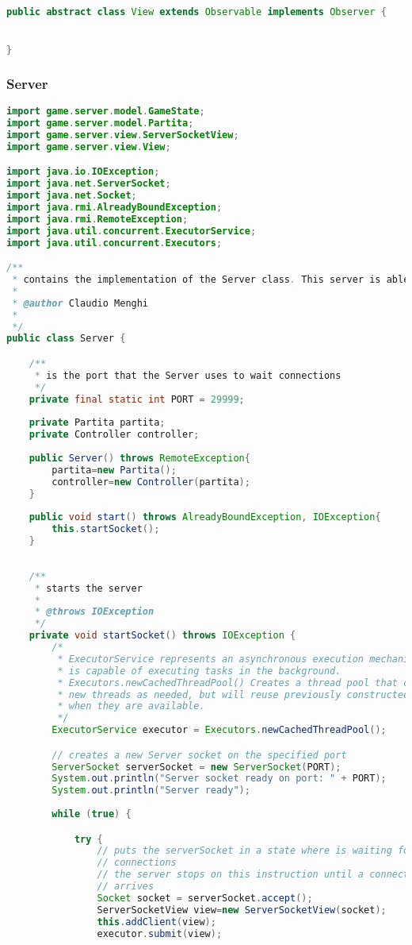 \documentclass{article}
\begin{document}
\begin{lstlisting}[language=Java,escapechar=|]
public abstract class View extends Observable implements Observer {


}
\end{lstlisting}
\subsubsection{Server}
\begin{lstlisting}[language=Java,escapechar=|]
import game.server.model.GameState;
import game.server.model.Partita;
import game.server.view.ServerSocketView;
import game.server.view.View;

import java.io.IOException;
import java.net.ServerSocket;
import java.net.Socket;
import java.rmi.AlreadyBoundException;
import java.rmi.RemoteException;
import java.util.concurrent.ExecutorService;
import java.util.concurrent.Executors;

/**
 * contains the implementation of the Server class. This server is able to manage multiple clients
 * 
 * @author Claudio Menghi
 * 
 */
public class Server {

	/**
	 * is the port that the Server uses to wait connections
	 */
	private final static int PORT = 29999;
	
	private Partita partita;
	private Controller controller;
	
	public Server() throws RemoteException{
		partita=new Partita();
		controller=new Controller(partita);
	}
	
	public void start() throws AlreadyBoundException, IOException{
		this.startSocket();
	}
	
	
	/**
	 * starts the server
	 * 
	 * @throws IOException
	 */
	private void startSocket() throws IOException {
		/*
		 * ExecutorService represents an asynchronous execution mechanism which
		 * is capable of executing tasks in the background.
		 * Executors.newCachedThreadPool() Creates a thread pool that creates
		 * new threads as needed, but will reuse previously constructed threads
		 * when they are available.
		 */
		ExecutorService executor = Executors.newCachedThreadPool();

		// creates a new Server socket on the specified port
		ServerSocket serverSocket = new ServerSocket(PORT);
		System.out.println("Server socket ready on port: " + PORT);
		System.out.println("Server ready");
		
		while (true) {

			try {
				// puts the serverSocket in a state where is waiting for client
				// connections
				// the server stops on this instruction until a connection
				// arrives
				Socket socket = serverSocket.accept();
				ServerSocketView view=new ServerSocketView(socket);
				this.addClient(view);
				executor.submit(view);
				


\end{lstlisting}
\end{document}
